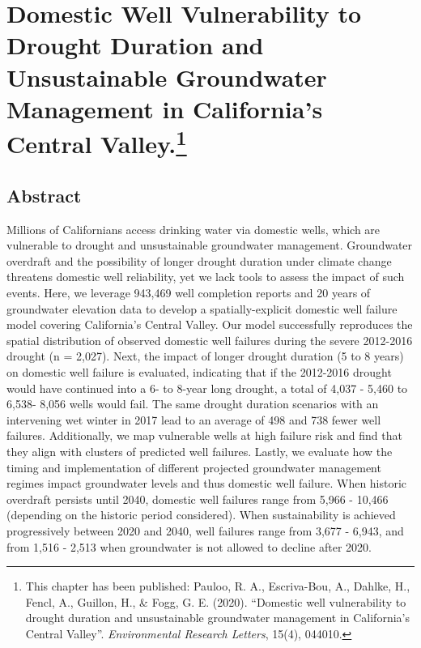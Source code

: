 
\chapter[Domestic Well Vulnerability to Drought Duration and Unsustainable Groundwater Management in California's Central Valley.]{Domestic Well Vulnerability to Drought Duration and Unsustainable Groundwater Management in California's Central Valley.\footnote[1]{This chapter has been published: Pauloo, R. A., Escriva-Bou, A., Dahlke, H., Fencl, A., Guillon, H., \& Fogg, G. E. (2020). ``Domestic well vulnerability to drought duration and unsustainable groundwater management in California’s Central Valley''. \textit{Environmental Research Letters}, 15(4), 044010.}}



\section{Abstract}
    
\noindent Millions of Californians access drinking water via domestic wells, which are vulnerable to drought and unsustainable groundwater management. Groundwater overdraft and the possibility of longer drought duration under climate change threatens domestic well reliability, yet we lack tools to assess the impact of such events. Here, we leverage 943,469 well completion reports and 20 years of groundwater elevation data to develop a spatially-explicit domestic well failure model covering California's Central Valley. Our model successfully reproduces the spatial distribution of observed domestic well failures during the severe 2012-2016 drought (n = 2,027). Next, the impact of longer drought duration (5 to 8 years) on domestic well failure is evaluated, indicating that if the 2012-2016 drought would have continued into a 6- to 8-year long drought, a total of 4,037 - 5,460 to 6,538- 8,056 wells would fail. The same drought duration scenarios with an intervening wet winter in 2017 lead to an average of 498 and 738 fewer well failures. Additionally, we map vulnerable wells at high failure risk and find that they align with clusters of predicted well failures. Lastly, we evaluate how the timing and implementation of different projected groundwater management regimes impact groundwater levels and thus domestic well failure. When historic overdraft persists until 2040, domestic well failures range from 5,966 - 10,466 (depending on the historic period considered). When sustainability is achieved progressively between 2020 and 2040, well failures range from 3,677 - 6,943, and from 1,516 - 2,513 when groundwater is not allowed to decline after 2020. 



